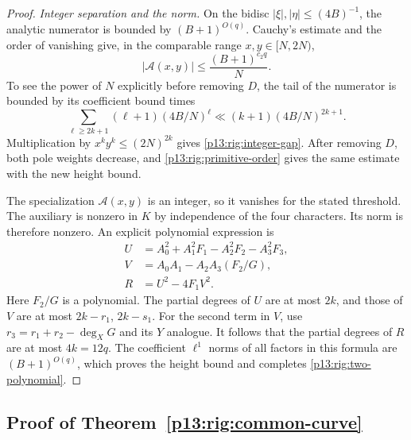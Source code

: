 \begin{proof}
\emph{Integer separation and the norm.}
On the bidisc $|\xi|,|\eta|\le(4B)^{-1}$, the analytic
numerator is bounded by $(B+1)^{O(q)}$.  Cauchy's estimate
and the order of vanishing give, in the comparable range
$x,y\in[N,2N)$,
\begin{equation}
                  |\mathcal A(x,y)|\le
                                   \frac{(B+1)^{c_2q}}N.
 \label{p13:rig:integer-gap}
\end{equation}
To see the power of $N$ explicitly before removing $D$, the
tail of the numerator is bounded by its coefficient bound
times
\[
 \sum_{\ell\ge2k+1}(\ell+1)(4B/N)^\ell
       \ll(k+1)(4B/N)^{2k+1}.
\]
Multiplication by $x^ky^k\le(2N)^{2k}$ gives
\eqref{p13:rig:integer-gap}.  After removing $D$, both pole
weights decrease, and \eqref{p13:rig:primitive-order} gives
the same estimate with the new height bound.

The specialization $\mathcal A(x,y)$ is an integer, so it
vanishes for the stated threshold.  The auxiliary is nonzero
in $K$ by independence of the four characters.  Its norm is
therefore nonzero.  An explicit polynomial expression is
\[
 \begin{split}
 U&=A_0^2+A_1^2F_1-A_2^2F_2-A_3^2F_3,\\
 V&=A_0A_1-A_2A_3(F_2/G),\\
 R&=U^2-4F_1V^2.
 \end{split}
\]
Here $F_2/G$ is a polynomial.  The partial degrees of $U$
are at most $2k$, and those of $V$ are at most
$2k-r_1$, $2k-s_1$.  For the second term in $V$, use
$r_3=r_1+r_2-\deg_XG$ and its $Y$ analogue.
It follows that the partial degrees of $R$ are at most
$4k=12q$.  The coefficient $\ell^1$ norms of all factors
in this formula are $(B+1)^{O(q)}$, which proves the height
bound and completes \eqref{p13:rig:two-polynomial}.
\end{proof}


\subsection{Proof of Theorem~\ref{p13:rig:common-curve}}
\label{p14:comp:rigidity:common-curve}

